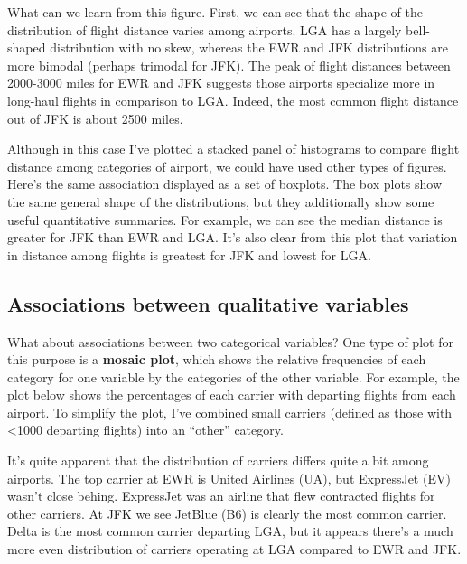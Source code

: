 \documentclass[
]{book}
\begin{document}
What can we learn from this figure. First, we can see that the shape of the distribution of flight distance varies among airports. LGA has a largely bell-shaped distribution with no skew, whereas the EWR and JFK distributions are more bimodal (perhaps trimodal for JFK). The peak of flight distances between 2000-3000 miles for EWR and JFK suggests those airports specialize more in long-haul flights in comparison to LGA. Indeed, the most common flight distance out of JFK is about 2500 miles.

Although in this case I've plotted a stacked panel of histograms to compare flight distance among categories of airport, we could have used other types of figures. Here's the same association displayed as a set of boxplots. The box plots show the same general shape of the distributions, but they additionally show some useful quantitative summaries. For example, we can see the median distance is greater for JFK than EWR and LGA. It's also clear from this plot that variation in distance among flights is greatest for JFK and lowest for LGA.

\subsection{Associations between qualitative variables}\label{associations-between-qualitative-variables}

What about associations between two categorical variables? One type of plot for this purpose is a \textbf{mosaic plot}, which shows the relative frequencies of each category for one variable by the categories of the other variable. For example, the plot below shows the percentages of each carrier with departing flights from each airport. To simplify the plot, I've combined small carriers (defined as those with \textless1000 departing flights) into an ``other'' category.

It's quite apparent that the distribution of carriers differs quite a bit among airports. The top carrier at EWR is United Airlines (UA), but ExpressJet (EV) wasn't close behing. ExpressJet was an airline that flew contracted flights for other carriers. At JFK we see JetBlue (B6) is clearly the most common carrier. Delta is the most common carrier departing LGA, but it appears there's a much more even distribution of carriers operating at LGA compared to EWR and JFK.
\end{document}
